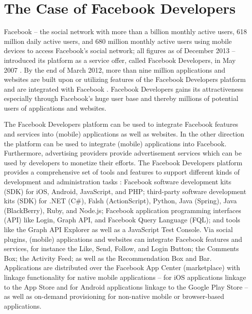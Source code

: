 

\section{The Case of Facebook Developers}

Facebook -- the social network with more than a billion monthly active users, 618 million daily active users, and 680 million monthly active users using mobile devices to access Facebook's social network; all figures as of December 2013 -- introduced its platform as a service offer, called Facebook Developers, in May 2007 \citep{Facebook2013}. By the end of March 2012, more than nine million applications and websites are built upon or utilizing features of the Facebook Developers platform and are integrated with Facebook \citep{Facebook2013}. Facebook Developers gains its attractiveness especially through Facebook's huge user base and thereby millions of potential users of applications and websites.

The Facebook Developers platform can be used to integrate Facebook features and services into (mobile) applications as well as websites. In the other direction the platform can be used to integrate (mobile) applications into Facebook. Furthermore, advertising providers provide advertisement services which can be used by developers to monetize their efforts. The Facebook Developers platform provides a comprehensive set of tools and features to support different kinds of development and administration tasks \citep{Facebook2013a}: Facebook software development kits (SDK) for iOS, Android, JavaScript, and PHP; third-party software development kits (SDK) for .NET (C\#), Falsh (ActionScript), Python, Java (Spring), Java (BlackBerry), Ruby, and Node.js; Facebook application programming interfaces (API) like Login, Graph API, and Facebook Query Language (FQL); and tools like the Graph API Explorer as well as a JavaScript Test Console. Via social plugins, (mobile) applications and websites can integrate Facebook features and services, for instance the Like, Send, Follow, and Login Button; the Comments Box; the Activity Feed; as well as the Recommendation Box and Bar. Applications are distributed over the Facebook App Center (marketplace) with linkage functionality for native mobile applications -- for iOS applications linkage to the App Store and for Android applications linkage to the Google Play Store -- as well as on-demand provisioning for non-native mobile or browser-based applications.

